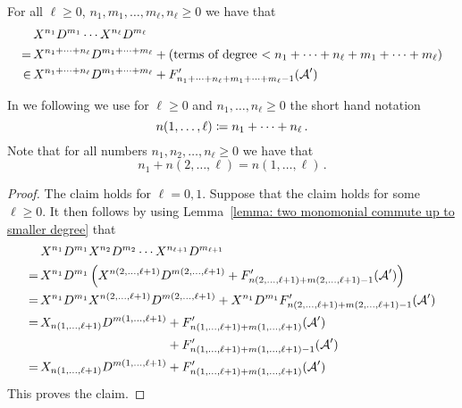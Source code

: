 \begin{corollary}
  \label{corollary: multiple monomials commute up to smaller degree}
  For all $\ell \geq 0$, $n_1, m_1, \dotsc, m_\ell, n_\ell \geq 0$ we have that
  \begin{align*}
       &\,  X^{n_1} D^{m_1} \dotsm X^{n_\ell} D^{m_\ell}  \\
      =&\,    X^{n_1 + \dotsb + n_\ell} D^{m_1 + \dotsb + m_\ell}
            + \left(
                \text{terms of degree $< n_1 + \dotsb + n_\ell + m_1 + \dotsb + m_\ell$}
              \right) \\
    \in&\,    X^{n_1 + \dotsb + n_\ell} D^{m_1 + \dotsb + m_\ell}
            + F'_{n_1 + \dotsb + n_\ell + m_1 + \dotsb + m_\ell - 1}(\operatorname{\mathcal{A}}')
  \end{align*}
\end{corollary}


\begin{notation}
  In we following we use for $\ell \geq 0$ and $n_1, \dotsc, n_\ell \geq 0$ the short hand notation
  \[
              n(1,\dotsc,\ell)
    \coloneqq  n_1 + \dotsb + n_\ell \,.
  \]
  Note that for all numbers $n_1, n_2, \dotsc, n_\ell \geq 0$ we have that
  \[
      n_1 + n(2, \dotsc, \ell)
    = n(1, \dotsc, \ell) \,.
  \]
\end{notation}

\begin{proof}
  The claim holds for $\ell = 0, 1$.
  Suppose that the claim holds for some $\ell \geq 0$.
  It then follows by using Lemma~\ref{lemma: two monomonial commute up to smaller degree} that
    \begin{align*}
     &\,  X^{n_1} D^{m_1} X^{n_2} D^{m_2} \dotsm X^{n_{\ell+1}} D^{m_{\ell+1}}  \\
    =&\,  X^{n_1} D^{m_1}
          \left(
              X^{n(2,\dotsc,\ell+1)} D^{m(2,\dotsc,\ell+1)}
            + F'_{n(2,\dotsc,\ell+1) + m(2,\dotsc,\ell+1) - 1}(\weyl')
          \right) \\
    =&\,    X^{n_1} D^{m_1} X^{n(2,\dotsc,\ell+1)} D^{m(2,\dotsc,\ell+1)}
          + X^{n_1} D^{m_1} F'_{n(2,\dotsc,\ell+1) + m(2,\dotsc,\ell+1) - 1}(\weyl') \\
    =&\,    X_{n(1,\dotsc,\ell+1)} D^{m(1,\dotsc,\ell+1)}
          + F'_{n(1,\dotsc,\ell+1) + m(1,\dotsc,\ell+1)}(\weyl') \\
     &\,    \phantom{ X_{n(1,\dotsc,\ell+1)} D^{m(1,\dotsc,\ell+1)} }
          + F'_{n(1,\dotsc,\ell+1) + m(1,\dotsc,\ell+1) - 1}(\weyl') \\
    =&\,    X_{n(1,\dotsc,\ell+1)} D^{m(1,\dotsc,\ell+1)}
          + F'_{n(1,\dotsc,\ell+1) + m(1,\dotsc,\ell+1)}(\weyl')
  \end{align*}
  This proves the claim.
\end{proof}


